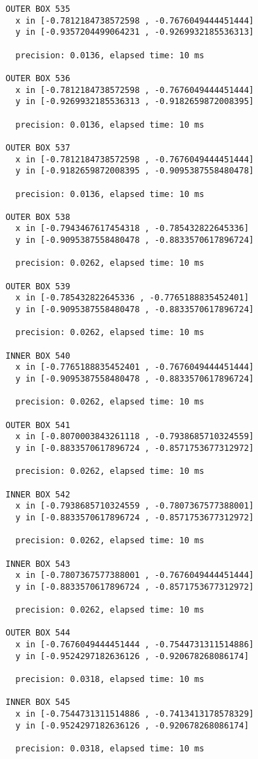 \begin{verbatim}
OUTER BOX 535
  x in [-0.7812184738572598 , -0.7676049444451444]
  y in [-0.9357204499064231 , -0.9269932185536313]

  precision: 0.0136, elapsed time: 10 ms

OUTER BOX 536
  x in [-0.7812184738572598 , -0.7676049444451444]
  y in [-0.9269932185536313 , -0.9182659872008395]

  precision: 0.0136, elapsed time: 10 ms

OUTER BOX 537
  x in [-0.7812184738572598 , -0.7676049444451444]
  y in [-0.9182659872008395 , -0.9095387558480478]

  precision: 0.0136, elapsed time: 10 ms

OUTER BOX 538
  x in [-0.7943467617454318 , -0.785432822645336]
  y in [-0.9095387558480478 , -0.8833570617896724]

  precision: 0.0262, elapsed time: 10 ms

OUTER BOX 539
  x in [-0.785432822645336 , -0.7765188835452401]
  y in [-0.9095387558480478 , -0.8833570617896724]

  precision: 0.0262, elapsed time: 10 ms

INNER BOX 540
  x in [-0.7765188835452401 , -0.7676049444451444]
  y in [-0.9095387558480478 , -0.8833570617896724]

  precision: 0.0262, elapsed time: 10 ms

OUTER BOX 541
  x in [-0.8070003843261118 , -0.7938685710324559]
  y in [-0.8833570617896724 , -0.8571753677312972]

  precision: 0.0262, elapsed time: 10 ms

INNER BOX 542
  x in [-0.7938685710324559 , -0.7807367577388001]
  y in [-0.8833570617896724 , -0.8571753677312972]

  precision: 0.0262, elapsed time: 10 ms

INNER BOX 543
  x in [-0.7807367577388001 , -0.7676049444451444]
  y in [-0.8833570617896724 , -0.8571753677312972]

  precision: 0.0262, elapsed time: 10 ms

OUTER BOX 544
  x in [-0.7676049444451444 , -0.7544731311514886]
  y in [-0.9524297182636126 , -0.920678268086174]

  precision: 0.0318, elapsed time: 10 ms

INNER BOX 545
  x in [-0.7544731311514886 , -0.7413413178578329]
  y in [-0.9524297182636126 , -0.920678268086174]

  precision: 0.0318, elapsed time: 10 ms


\end{verbatim}
